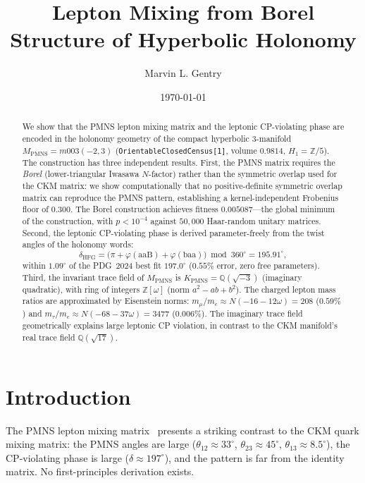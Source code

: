 \documentclass[11pt,a4paper]{article}
\theoremstyle{definition}
\newcommand{\MPMNS}{M_{\mathrm{PMNS}}}
\newcommand{\KPMNS}{K_{\mathrm{PMNS}}}
\newcommand{\Zom}{\mathbb{Z}[\omega]}
\newcommand{\Zfive}{\mathbb{Z}/5}
\begin{document}
\title{Lepton Mixing from Borel Structure of Hyperbolic Holonomy}

\author[1]{Marvin L. Gentry}
\date{\today}

\begin{abstract}
We show that the PMNS lepton mixing matrix and the leptonic
CP-violating phase are encoded in the holonomy geometry of the compact
hyperbolic 3-manifold $\MPMNS = m003(-2,3)$
(\texttt{OrientableClosedCensus[1]}, volume $0.9814$,
$H_1=\Zfive$).
The construction has three independent results.
First, the PMNS matrix requires the \emph{Borel} (lower-triangular
Iwasawa $N$-factor) rather than the symmetric overlap used for the CKM
matrix: we show computationally that no positive-definite symmetric
overlap matrix can reproduce the PMNS pattern, establishing a
kernel-independent Frobenius floor of $0.300$.
The Borel construction achieves fitness $0.005087$---the global
minimum of the construction, with $p<10^{-4}$ against
$50{,}000$ Haar-random unitary matrices.
Second, the leptonic CP-violating phase is derived parameter-freely
from the twist angles of the holonomy words:
\[
  \delta_{\mathrm{HFG}}
  = \bigl(\pi + \varphi(\mathrm{aaB}) + \varphi(\mathrm{baa})\bigr)
    \bmod 360^\circ
  = 195.91^\circ,
\]
within $1.09^\circ$ of the PDG~2024 best fit $197.0^\circ$
($0.55\%$ error, zero free parameters).
Third, the invariant trace field of $\MPMNS$ is
$\KPMNS = \mathbb{Q}(\sqrt{-3})$ (imaginary quadratic), with ring
of integers $\Zom$ (norm $a^2-ab+b^2$).
The charged lepton mass ratios are approximated by Eisenstein norms:
$m_\mu/m_e\approx N(-16-12\omega)=208$ ($0.59\%$) and
$m_\tau/m_e\approx N(-68-37\omega)=3477$ ($0.006\%$).
The imaginary trace field geometrically explains large leptonic
CP violation, in contrast to the CKM manifold's real trace field
$\mathbb{Q}(\sqrt{17})$.
\end{abstract}

\maketitle
\tableofcontents

\section{Introduction}
\label{sec:intro}

The PMNS lepton mixing matrix~\cite{Maki1962,PDG2024} presents a
striking contrast to the CKM quark mixing matrix: the PMNS angles are
large ($\theta_{12}\approx33^\circ$, $\theta_{23}\approx45^\circ$,
$\theta_{13}\approx8.5^\circ$), the CP-violating phase is large
($\delta\approx197^\circ$), and the pattern is far from the identity
matrix. No first-principles derivation exists.
\end{document}
